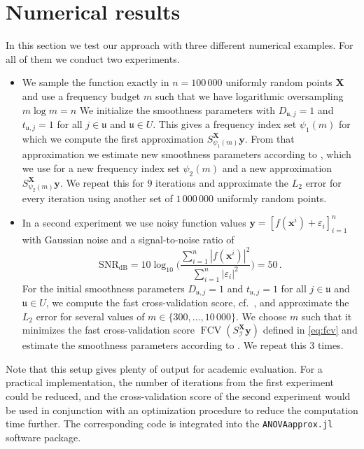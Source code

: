 \documentclass[a4paper]{scrartcl}
\numberwithin{equation}{section}
\DeclareMathOperator{\FCV}{FCV}
\begin{document}
 \section{Numerical results}\label{sec:numerics} 

In this section we test our approach with three different numerical examples.
For all of them we conduct two experiments.
\begin{itemize}
\item
    We sample the function exactly in $n=100\,000$ uniformly random points $\bm X$ and use a frequency budget $m$ such that we have logarithmic oversampling $m\log m = n$
    We initialize the smoothness parameters with $D_{\mathfrak u,j} = 1$ and $t_{\mathfrak u,j} = 1$ for all $j\in \mathfrak u$ and $\mathfrak u\in U$.
    This gives a frequency index set $\psi_1(m)$ for which we compute the first approximation $S_{\psi_1(m)}^{\bm X}\bm y$.
    From that approximation we estimate new smoothness parameters according to , which we use for a new frequency index set $\psi_{2}(m)$ and a new approximation $S_{\psi_2(m)}^{\bm X}\bm y$.
    We repeat this for $9$ iterations and approximate the $L_2$ error for every iteration using another set of $1\,000\,000$ uniformly random points.
\item
    In a second experiment we use noisy function values $\bm y = [ f(\bm x^i) + \varepsilon_i ]_{i=1}^{n}$ with Gaussian noise and a signal-to-noise ratio of
    \begin{equation*}
        \mathrm{SNR}_{\mathrm{dB}}
        = 10 \log_{10}\Big(\frac{\sum_{i=1}^{n}|f(\bm x^i)|^2}{\sum_{i=1}^{n}|\varepsilon_i|^2}\Big)
        = 50\,.
    \end{equation*}
    For the initial smoothness parameters $D_{\mathfrak u,j} = 1$ and $t_{\mathfrak u,j} = 1$ for all $j\in \mathfrak u$ and $\mathfrak u\in U$, we compute the fast cross-validation score, cf.~, and approximate the $L_2$ error for several values of $m\in\{300, \dots, 10\,000\}$.
    We choose $m$ such that it minimizes the fast cross-validation score $\FCV(S_{\mathcal I}^{\bm X}\bm y)$ defined in \eqref{eq:fcv} and estimate the smoothness parameters according to .
    We repeat this $3$ times.
\end{itemize}

Note that this setup gives plenty of output for academic evaluation.
For a practical implementation, the number of iterations from the first experiment could be reduced, and the cross-validation score of the second experiment would be used in conjunction with an optimization procedure to reduce the computation time further.
The corresponding code is integrated into the \texttt{ANOVAapprox.jl} software package.
\end{document}
